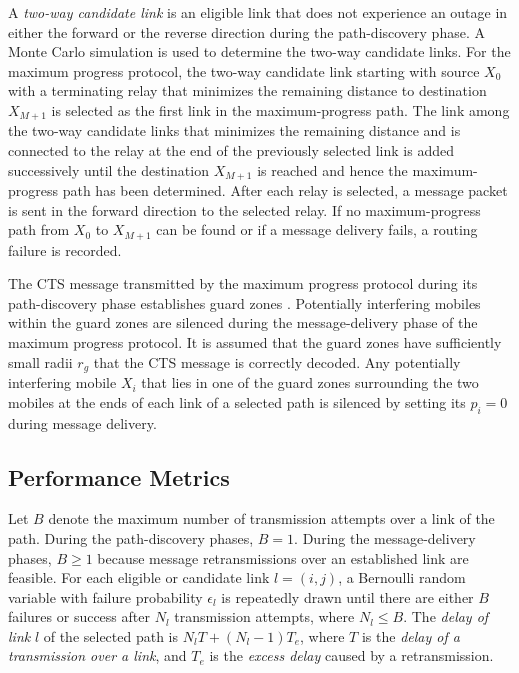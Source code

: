 \documentclass[conference]{IEEEtran}
\begin{document}
A \emph{two-way candidate link}
is an eligible link that does
not experience an outage in either the forward or the
reverse direction during the path-discovery phase. A
Monte Carlo simulation is used to determine the two-way
candidate links. For the maximum progress protocol, the
two-way candidate link starting with source
$X_0$ with a terminating relay that minimizes the remaining distance
to destination $X_{M+1}$
is selected as the first link in the
maximum-progress path. The link among the two-way
candidate links that minimizes the remaining distance
and is connected to the relay at the end of the previously
selected link is added successively until the destination
$X_{M+1}$ is reached and hence the maximum-progress path
has been determined. After each relay is selected, a
message packet is sent in the forward direction to the
selected relay. If no maximum-progress path from
$X_0$ to $X_{M+1}$ can be found or if a message delivery fails, a
routing failure is recorded.

The CTS message transmitted by the maximum
progress protocol during its path-discovery phase establishes guard zones \cite{tor1}. Potentially interfering mobiles
within the guard zones are silenced during the message-delivery phase of the maximum progress protocol. It is assumed that the guard zones have sufficiently small radii
$r_g$ that the CTS message is correctly decoded. Any
potentially interfering mobile $X_i$
that lies in one of the guard zones surrounding the two mobiles at the ends of each link of a selected path is silenced by setting its
$p_{i}=0$ during message delivery.



\subsection{Performance Metrics}

Let $B$ denote the maximum number of transmission
attempts over a link of the path. During the path-discovery phases, $B=1$. During the message-delivery phases, $B\geq1$ because message retransmissions over an established link are feasible. For each eligible or
candidate link $l=(i,j)$, a Bernoulli random variable
with failure probability $\epsilon_{l}$
is repeatedly drawn until there
are either $B$ failures or success after
$N_l$ transmission attempts, where $N_l  \leq B$. The
\emph{delay of link}
$l$ of the
selected path is $N_l T +(N_l-1)T_e$, where $T$
is the \emph{delay of a transmission over a link}, and
$T_e$ is the \emph{excess delay} caused by a retransmission.
\end{document}

